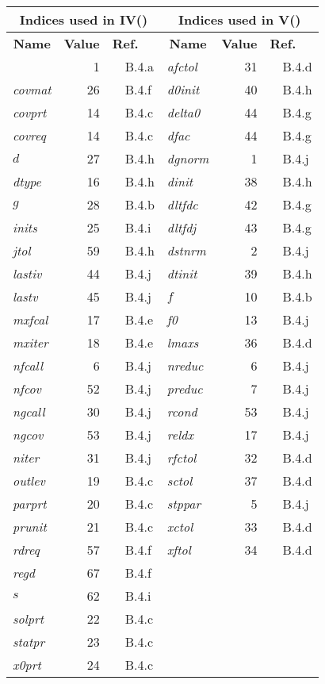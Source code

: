 \documentclass[twoside]{MATH77}
\begin{document}
\begin{tabular}{|@{\ }l@{}r@{\ \ \ \ }l|l@{}r@{\ \ \ \ }l|}\hline
\multicolumn{3}{|c|}{\bf Indices used in IV()} & \multicolumn{3}{c|}{\bf
Indices used in V()}\\\hline
\multicolumn{1}{|c|}{\bf Name} & \multicolumn{1}{r|}{\bf
Value} & \multicolumn{1}{l|}{\bf Ref.} &
\multicolumn{1}{c|}{\bf Name} & \multicolumn{1}{r|}{\bf
Value} & \multicolumn{1}{l|}{\bf Ref.}\\\hline
       & 1 & \ \ B.4.a & {\em afctol} & 31 & \ \ B.4.d\\
{\em covmat} & 26 & \ \ B.4.f & {\em d0init} & 40 & \ \ B.4.h\\
{\em covprt} & 14 & \ \ B.4.c & {\em delta0} & 44 & \ \ B.4.g\\
{\em covreq} & 14 & \ \ B.4.c & {\em dfac} & 44 & \ \ B.4.g\\
$d$ & 27 & \ \ B.4.h & {\em dgnorm} & 1 & \ \ B.4.j\\
{\em dtype} & 16 & \ \ B.4.h & {\em dinit} & 38 & \ \ B.4.h\\
$g$ & 28 & \ \ B.4.b & {\em dltfdc} & 42 & \ \ B.4.g\\
{\em inits} & 25 & \ \ B.4.i & {\em dltfdj} & 43 & \ \ B.4.g\\
{\em jtol} & 59 & \ \ B.4.h & {\em dstnrm} & 2 & \ \ B.4.j\\
{\em lastiv} & 44 & \ \ B.4.j & {\em dtinit} & 39 & \ \ B.4.h\\
{\em lastv} & 45 & \ \ B.4.j & $f$ & 10 & \ \ B.4.b\\
{\em mxfcal} & 17 & \ \ B.4.e & {\em f0} & 13 & \ \ B.4.j\\
{\em mxiter} & 18 & \ \ B.4.e & {\em lmaxs} & 36 & \ \ B.4.d\\
{\em nfcall} & 6 & \ \ B.4.j & {\em nreduc} & 6 & \ \ B.4.j\\
{\em nfcov} & 52 & \ \ B.4.j & {\em preduc} & 7 & \ \ B.4.j\\
{\em ngcall} & 30 & \ \ B.4.j & {\em rcond} & 53 & \ \ B.4.j\\
{\em ngcov} & 53 & \ \ B.4.j & {\em reldx} & 17 & \ \ B.4.j\\
{\em niter} & 31 & \ \ B.4.j & {\em rfctol} & 32 & \ \ B.4.d\\
{\em outlev} & 19 & \ \ B.4.c & {\em sctol} & 37 & \ \ B.4.d\\
{\em parprt} & 20 & \ \ B.4.c & {\em stppar} & 5 & \ \ B.4.j\\
{\em prunit} & 21 & \ \ B.4.c & {\em xctol} & 33 & \ \ B.4.d\\
{\em rdreq} & 57 & \ \ B.4.f & {\em xftol} & 34 & \ \ B.4.d\\
{\em regd} & 67 & \ \ B.4.f & \ & \ & \ \\
$s$ & 62 & \ \ B.4.i & \ & \ & \ \\
{\em solprt} & 22 & \ \ B.4.c & \ & \ & \ \\
{\em statpr} & 23 & \ \ B.4.c & \ & \ & \ \\
{\em x0prt} & 24 & \ \ B.4.c & \ & \ & \ \\\hline
\end{tabular}
\end{document}
